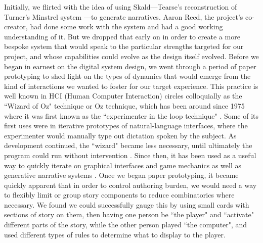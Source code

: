 Initially, we flirted with the idea of using Skald---Tearse's reconstruction of Turner's Minstrel system \cite{tearse_skald}---to generate narratives. Aaron Reed, the project's co-creator, had done some work with the system and had a good working understanding of it. But we dropped that early on in order to create a more bespoke system that would speak to the particular strengths targeted for our project, and whose capabilities could evolve as the design itself evolved.
Before we began in earnest on the digital system design, we went through a period of paper prototyping to shed light on the types of dynamics that would emerge from the kind of interactions we wanted to foster for our target experience. This practice is well known in HCI (Human Computer Interaction) circles colloquially as the ``Wizard of Oz" technique or Oz technique, which has been around since 1975 where it was first known as the ``experimenter in the loop technique" \cite{wizard_of_oz}. Some of its first uses were in iterative prototypes of natural-language interfaces, where the experimenter would manually type out dictation spoken by the subject. As development continued, the ``wizard" became less necessary, until ultimately the program could run without intervention \cite{kelley1984iterative}. Since then, it has been used as a useful way to quickly iterate on graphical interfaces \cite{snyder2003paper} and game mechanics \cite{mayra2004player} as well as generative narrative systems \cite{cozy_mystery}.
Once we began paper prototyping, it became quickly apparent that in order to control authoring burden, we would need a way to flexibly limit or group story components to reduce combinatorics where necessary. We found we could successfully gauge this by using small cards with sections of story on them, then having one person be ``the player" and ``activate" different parts of the story, while the other person played ``the computer", and used different types of rules to determine what to display to the player.


